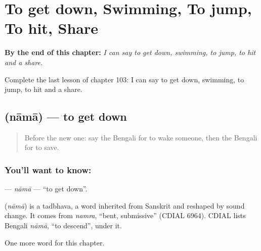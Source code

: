 
\chapter{To get down, Swimming, To jump, To hit, Share}
\label{ch:bn-to-get-down-swimming-to-jump-to-hit-share}

\begin{chapteropening}
\textbf{By the end of this chapter:} \emph{I can say to get down, swimming, to jump, to hit and a share.}

Complete the last lesson of chapter 103: I can say to get down, swimming, to jump, to hit and a share.
\end{chapteropening}

\section[\texorpdfstring{\bn{নামা} (nāmā)}{নামা (nāmā)}]{ (nāmā) — to get down}

\label{lesson:BN-C103-nama}



\begin{quote}
Before the new one: say the Bengali for to wake someone, then the Bengali for to save.
\end{quote}

\subsection*{You'll want to know: }
\textbf{} — \emph{nāmā} — \textquotedblleft{}to get down\textquotedblright{}.

\begin{cousinweb}
\textbf{} (\emph{nāmā}) is a tadbhava, a word inherited from Sanskrit and reshaped by sound change. It comes from \emph{namra}, \textquotedblleft{}bent, submissive\textquotedblright{} (CDIAL 6964). CDIAL lists Bengali \emph{nāmā}, \textquotedblleft{}to descend\textquotedblright{}, under it.
\end{cousinweb}

\begin{grammarlens}[title={What you've built}]
One more word for this chapter.
\end{grammarlens}

